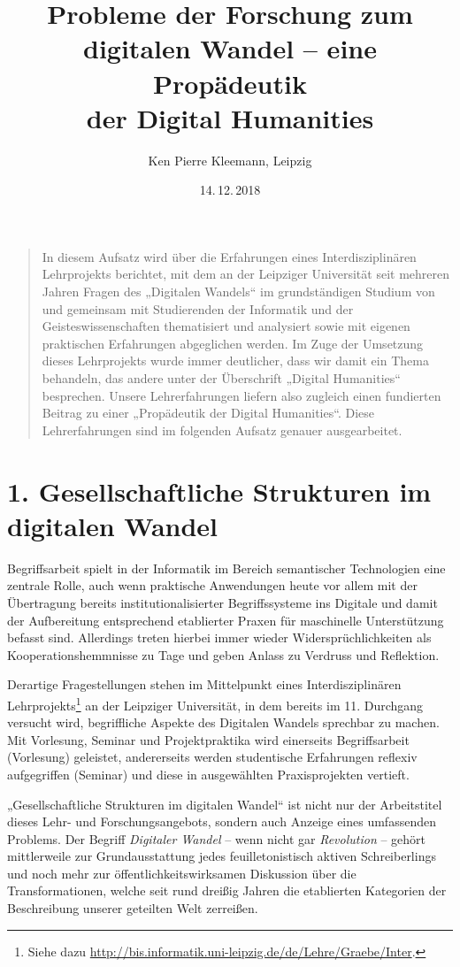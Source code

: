 \documentclass[12pt,a4paper]{article}
\title{Probleme der Forschung zum\\ digitalen Wandel – eine Propädeutik\\ der
  Digital Humanities}
\author{Ken Pierre Kleemann, Leipzig}
\date{14.\,12.\,2018}
\begin{document}
\maketitle

\begin{quote}
In diesem Aufsatz wird über die Erfahrungen eines Interdisziplinären
Lehrprojekts berichtet, mit dem an der Leipziger Universität seit mehreren
Jahren Fragen des „Digitalen Wandels“ im grundständigen Studium von und
gemeinsam mit Studierenden der Informatik und der Geisteswissenschaften
thematisiert und analysiert sowie mit eigenen praktischen Erfahrungen
abgeglichen werden.  Im Zuge der Umsetzung dieses Lehrprojekts wurde immer
deutlicher, dass wir damit ein Thema behandeln, das andere unter der
Überschrift „Digital Humanities“ besprechen. Unsere Lehrerfahrungen liefern
also zugleich einen fundierten Beitrag zu einer „Propädeutik der Digital
Humanities“. Diese Lehrerfahrungen sind im folgenden Aufsatz genauer
ausgearbeitet.
\end{quote}

\section*{1. Gesellschaftliche Strukturen im digitalen Wandel}

Begriffsarbeit spielt in der Informatik im Bereich semantischer Technologien
eine zentrale Rolle, auch wenn praktische Anwendungen heute vor allem mit der
Übertragung bereits institutionalisierter Begriffssysteme ins Digitale und
damit der Aufbereitung entsprechend etablierter Praxen für maschinelle
Unterstützung befasst sind. Allerdings treten hierbei immer wieder
Widersprüchlichkeiten als Kooperationshemmnisse zu Tage und geben Anlass zu
Verdruss und Reflektion.

Derartige Fragestellungen stehen im Mittelpunkt eines Interdisziplinären
Lehrprojekts\footnote{Siehe dazu
  \url{http://bis.informatik.uni-leipzig.de/de/Lehre/Graebe/Inter}.} an der
Leipziger Universität, in dem bereits im 11. Durchgang versucht wird,
begriffliche Aspekte des Digitalen Wandels sprechbar zu machen. Mit Vorlesung,
Seminar und Projektpraktika wird einerseits Begriffsarbeit (Vorlesung)
geleistet, andererseits werden studentische Erfahrungen reflexiv aufgegriffen
(Seminar) und diese in ausgewählten Praxisprojekten vertieft.

„Gesellschaftliche Strukturen im digitalen Wandel“ ist nicht nur der
Arbeitstitel dieses Lehr- und Forschungsangebots, sondern auch Anzeige eines
umfassenden Problems. Der Begriff \emph{Digitaler Wandel} -- wenn nicht gar
\emph{Revolution} -- gehört mittlerweile zur Grundausstattung jedes
feuilletonistisch aktiven Schreiberlings und noch mehr zur
öffentlichkeitswirksamen Diskussion über die Transformationen, welche seit
rund dreißig Jahren die etablierten Kategorien der Beschreibung unserer
geteilten Welt zerreißen.
\end{document}
